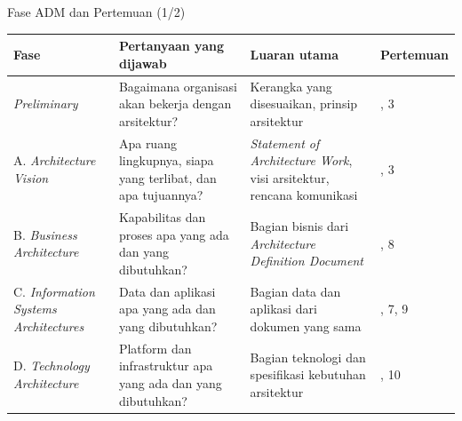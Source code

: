 \documentclass[aspectratio=169, table, 12pt]{beamer}
\begin{document}
\begin{frame}{{\Large Fase ADM dan Pertemuan (1/2)}}
  \scriptsize
  \begin{tabularx}{\textwidth}{>{\raggedright\arraybackslash}p{3.0cm}
      >{\raggedright\arraybackslash}X >{\raggedright\arraybackslash}X
      >{\raggedright\arraybackslash}p{1.6cm}}
    \hline
    \textbf{Fase} & \textbf{Pertanyaan yang dijawab} & \textbf{Luaran utama} & \textbf{Pertemuan} \\
    \hline
    \textit{Preliminary} & Bagaimana organisasi akan bekerja dengan arsitektur? & Kerangka yang disesuaikan, prinsip arsitektur & 1, 3 \\
    \hline
    A. \textit{Architecture Vision} & Apa ruang lingkupnya, siapa yang terlibat, dan apa tujuannya? & \textit{Statement of Architecture Work}, visi arsitektur, rencana komunikasi & 2, 3 \\
    \hline
    B. \textit{Business Architecture} & Kapabilitas dan proses apa yang ada dan yang dibutuhkan? & Bagian bisnis dari \textit{Architecture Definition Document} & 5, 8 \\
    \hline
    C. \textit{Information Systems Architectures} & Data dan aplikasi apa yang ada dan yang dibutuhkan? & Bagian data dan aplikasi dari dokumen yang sama & 6, 7, 9 \\
    \hline
    D. \textit{Technology Architecture} & Platform dan infrastruktur apa yang ada dan yang dibutuhkan? & Bagian teknologi dan spesifikasi kebutuhan arsitektur & 7, 10 \\
    \hline
  \end{tabularx}
\end{frame}
\end{document}
